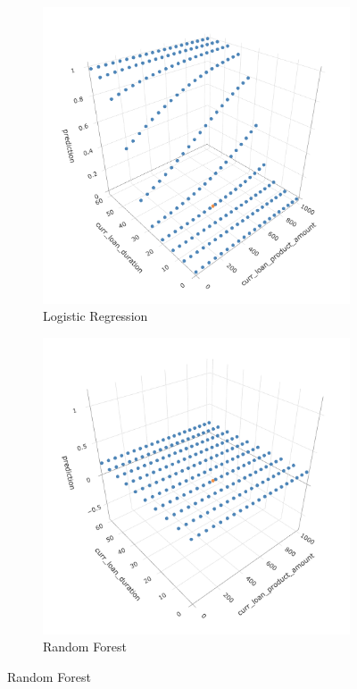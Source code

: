 \documentclass{article}
\begin{document}
\begin{samepage}
\begin{figure}
    \centering
    \begin{subfigure}{.32\textwidth}
        \centering
        \includegraphics[width=.8\linewidth]{img/posthoc-admissible-lin.png}
        \caption{Logistic Regression}
        \label{fig:posthoc-admissible-lin}
    \end{subfigure}
    \begin{subfigure}{.32\textwidth}
        \centering
        \includegraphics[width=.8\linewidth]{img/posthoc-admissible-xgboost.png}
        \caption{Random Forest}
        \label{fig:posthoc-admissible-xgboost}

\end{subfigure}
\end{figure}
\end{samepage}
\end{document}
